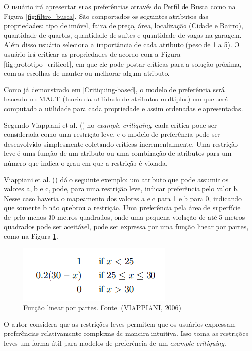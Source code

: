 O usuário irá apresentar suas preferências através do Perfil de Busca como na Figura \ref{fig:filtro_busca}. São comportados os seguintes atributos das propriedades: tipo de imóvel, faixa de preço, área, localização (Cidade e Bairro), quantidade de quartos, quantidade de suítes e quantidade de vagas na garagem. Além disso usuário seleciona a importância de cada atributo (peso de 1 a 5). O usuário irá criticar as propriedades de acordo com a Figura \ref{fig:prototipo_critico1}, em que ele pode postar críticas para a solução próxima, com as escolhas de manter ou melhorar algum atributo.

Como já demonstrado em \ref{Critiquing-based}, o modelo de preferência será baseado no MAUT (teoria da utilidade de atributos múltiplos) em que será computado a utilidade para cada propriedade e assim ordenadas e apresentadas.

Segundo Viappiani et al. (\citeyear{Viappiani}) no \textit{example critiquing}, cada crítica pode ser considerada como uma restrição leve, e o modelo de preferência pode ser desenvolvido simplesmente coletando críticas incrementalmente. Uma restrição leve é uma função de um atributo ou uma combinação de atributos para um número que indica o grau em que a restrição é violada.

Viappiani et al. (\citeyear{Viappiani}) dá o seguinte exemplo: um atributo que pode assumir os valores a, b e c, pode, para uma restrição leve, indicar preferência pelo valor b. Nesse caso haveria o mapeamento dos valores a e c para 1 e b para 0, indicando que somente b não quebrou a restrição. Uma preferência pela área de superfície de pelo menos 30 metros quadrados, onde uma pequena violação de até 5 metros quadrados pode ser aceitável, pode ser expressa por uma função linear por partes, como na Figura \ref{fig:funcao_linear}.

\begin{figure}[H]
    \centering
    \includegraphics[scale=0.8]{figuras/proposta/funcao_linear.png}
    \caption[Função linear por partes]{Função linear por partes. Fonte: (VIAPPIANI, 2006)}
    \label{fig:funcao_linear}
\end{figure}

O autor considera que as restrições leves permitem que os usuários expressam preferências relativamente complexas de maneira intuitiva. Isso torna as restrições leves um forma útil para modelos de preferência de um \textit{example critiquing}.

